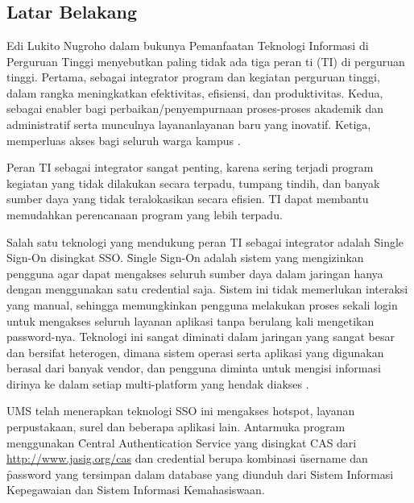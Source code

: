 \chapter{\babSatu}

\section{Latar Belakang}
Edi Lukito Nugroho dalam bukunya Pemanfaatan Teknologi Informasi di Perguruan Tinggi menyebutkan paling tidak ada tiga peran \gls{ti} (TI) di perguruan tinggi. Pertama, sebagai integrator program dan kegiatan perguruan tinggi, dalam rangka meningkatkan efektivitas, efisiensi, dan produktivitas. Kedua, sebagai enabler bagi perbaikan/penyempurnaan proses-proses akademik dan administratif serta munculnya layananlayanan baru yang inovatif. Ketiga, memperluas akses bagi seluruh warga kampus \cite{nugroho2009}. 

Peran TI sebagai integrator sangat penting, karena sering terjadi program kegiatan yang tidak dilakukan secara terpadu, tumpang tindih, dan banyak sumber daya yang tidak teralokasikan secara efisien. TI dapat membantu memudahkan perencanaan program yang lebih terpadu.

Salah satu teknologi yang mendukung peran TI sebagai integrator adalah \f{Single Sign-On} disingkat SSO. \f{Single Sign-On} adalah sistem yang mengizinkan pengguna agar dapat mengakses seluruh sumber daya dalam jaringan hanya dengan menggunakan satu\f{ \gls{credential}} saja. Sistem ini tidak memerlukan interaksi yang manual, sehingga memungkinkan pengguna melakukan proses sekali login untuk mengakses seluruh layanan aplikasi tanpa berulang kali mengetikan password-nya. Teknologi ini sangat diminati dalam jaringan yang sangat besar dan bersifat heterogen, dimana sistem operasi serta aplikasi yang digunakan berasal dari banyak vendor, dan pengguna diminta untuk mengisi informasi dirinya ke dalam setiap multi-platform yang hendak diakses \cite{luthfi2012}. 

UMS telah menerapkan teknologi SSO ini mengakses \gls{hotspot}, layanan perpustakaan, \gls{surel} dan beberapa aplikasi lain. Antarmuka program menggunakan \f{Central Authentication Service} yang disingkat CAS dari \url{http://www.jasig.org/cas} dan \f{\gls{credential}} berupa kombinasi \f{username} dan \f{password} yang tersimpan dalam database  yang diunduh dari Sistem Informasi Kepegawaian dan Sistem Informasi Kemahasiswaan.

